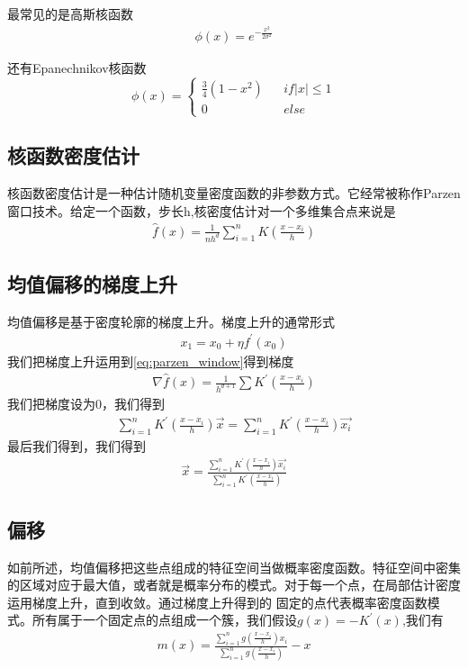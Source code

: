 最常见的是高斯核函数
\begin{align}\label{eq:kernel_guassian}
	\phi (x) = e^{-\frac{x^{2}}{2\sigma^2}}
\end{align}

还有Epanechnikov核函数
\begin{equation}\label{eq:kernel_rectangular}
\phi (x)=\left\{
\begin{aligned}
 \frac{3}{4}(1-x^{2})  && {if \left| x \right| \leq 1} \\
 0  && {else}
\end{aligned}
\right.
\end{equation}

\subsection{核函数密度估计}
核函数密度估计是一种估计随机变量密度函数的非参数方式。它经常被称作Parzen窗口技术。给定一个函数，步长h,核密度估计对一个多维集合点来说是
\begin{align}\label{eq:parzen_window}
	\hat{f}(x) = \frac{1}{nh^d}\sum_{i=1}^{n}K(\frac{x-x_{i}}{h})
\end{align}

\subsection{均值偏移的梯度上升}
均值偏移是基于密度轮廓的梯度上升。梯度上升的通常形式
\begin{align}\label{eq:gradient_ascent}
	x_{1} = x_{0} + \eta f^{'}(x_{0})
\end{align}
我们把梯度上升运用到\eqref{eq:parzen_window}得到梯度
\begin{align}\label{eq:eq:parzen_window_gradient}
	\nabla \hat{f}(x)= \frac{1}{h^{d+1}}\sum K^{'}(\frac{x-x_{i}}{h})
\end{align}
我们把梯度设为0，我们得到
\begin{align}\label{eq:parzen_window_gradient}
\sum_{i=1}^{n}K^{'}(\frac{x-x_{i}}{h})\vec{x} = \sum_{i=1}^{n}K^{'}(\frac{x-x_{i}}{h})\vec{x_{i}}
\end{align}
最后我们得到，我们得到
\begin{align}\label{eq:original_mean_shift_vector}
\vec{x} =
\frac{\sum_{i=1}^{n}K^{'}(\frac{x-x_{i}}{h})\vec{x_{i}}}{\sum_{i=1}^{n}K^{'}(\frac{x-x_{i}}{h})}
\end{align}

\subsection{偏移}
如前所述，均值偏移把这些点组成的特征空间当做概率密度函数。特征空间中密集的区域对应于最大值，或者就是概率分布的模式。对于每一个点，在局部估计密度运用梯度上升，直到收敛。通过梯度上升得到的
固定的点代表概率密度函数模式。所有属于一个固定点的点组成一个簇，我们假设$g(x) = -K^{'}(x) $,我们有
\begin{align}\label{eq:mean_shift_mx}
m(x) =
\frac{\sum_{i=1}^{n}g(\frac{x-x_{i}}{h})x_{i}}{\sum_{i=1}^{n}g(\frac{x-x_{i}}{h})}
- x
\end{align}

